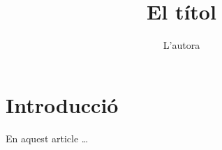 \documentclass{article}
\title{El títol}
\author{L'autora}
\begin{document}
\maketitle

\section{Introducció}

En aquest article \dots
\end{document}
